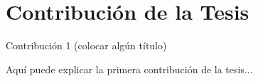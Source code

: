 \section{Contribución de la Tesis}

\begin{contribution}{Contribución 1 (colocar algún título)}

Aquí puede explicar la primera contribución de la tesis...
 
\end{contribution}